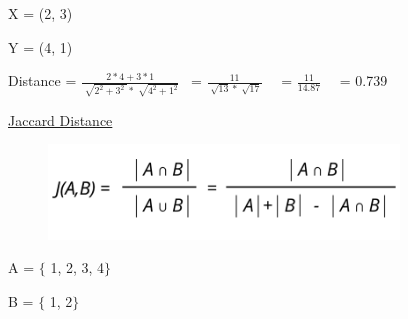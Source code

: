 \documentclass[12pt]{article}
\renewcommand{\_}{\kern-1.5pt\textunderscore\kern-1.5pt}
\begin{document}

\par

{\fontsize{14pt}{16.8pt}\selectfont X = (2, 3)\par}\par

{\fontsize{14pt}{16.8pt}\selectfont Y = (4, 1)\par}\par

{\fontsize{14pt}{16.8pt}\selectfont Distance =  \( \frac{2\ast4+3\ast1}{\sqrt[]{2^{2}+ 3^{2}~}\ast \sqrt[]{4^{2}+ 1^{2}}} \) \  =  \( \frac{11}{\sqrt[]{13} \ast \sqrt[]{17}} \) \ \  =  \( \frac{11}{14.87} \) \ \  = 0.739\par}\par


\vspace{\baselineskip}

\vspace{\baselineskip}

\vspace{\baselineskip}
{\fontsize{14pt}{16.8pt}\selectfont \uline{Jaccard Distance}\par}\par




\begin{figure}[H]
	\begin{Center}
		\includegraphics[width=3.67in,height=0.99in]{./media/image7.png}
	\end{Center}
\end{figure}



\par

{\fontsize{14pt}{16.8pt}\selectfont A = $ \{ $ 1, 2, 3, 4$ \} $ \par}\par

{\fontsize{14pt}{16.8pt}\selectfont B = $ \{ $ 1, 2$ \} $ \par}\par
\end{document}

